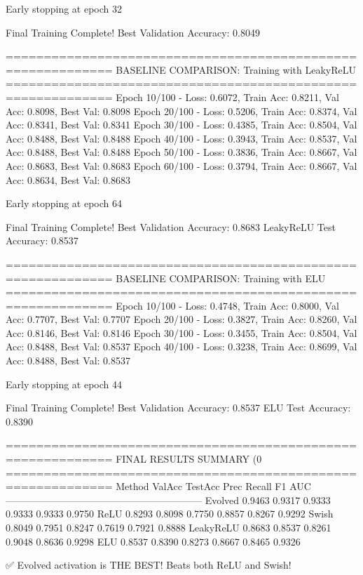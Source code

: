 Early stopping at epoch 32

Final Training Complete!
Best Validation Accuracy: 0.8049

============================================================
BASELINE COMPARISON: Training with LeakyReLU
============================================================
Epoch  10/100 - Loss: 0.6072, Train Acc: 0.8211, Val Acc: 0.8098, Best Val: 0.8098
Epoch  20/100 - Loss: 0.5206, Train Acc: 0.8374, Val Acc: 0.8341, Best Val: 0.8341
Epoch  30/100 - Loss: 0.4385, Train Acc: 0.8504, Val Acc: 0.8488, Best Val: 0.8488
Epoch  40/100 - Loss: 0.3943, Train Acc: 0.8537, Val Acc: 0.8488, Best Val: 0.8488
Epoch  50/100 - Loss: 0.3836, Train Acc: 0.8667, Val Acc: 0.8683, Best Val: 0.8683
Epoch  60/100 - Loss: 0.3794, Train Acc: 0.8667, Val Acc: 0.8634, Best Val: 0.8683

Early stopping at epoch 64

Final Training Complete!
Best Validation Accuracy: 0.8683
LeakyReLU Test Accuracy: 0.8537

============================================================
BASELINE COMPARISON: Training with ELU
============================================================
Epoch  10/100 - Loss: 0.4748, Train Acc: 0.8000, Val Acc: 0.7707, Best Val: 0.7707
Epoch  20/100 - Loss: 0.3827, Train Acc: 0.8260, Val Acc: 0.8146, Best Val: 0.8146
Epoch  30/100 - Loss: 0.3455, Train Acc: 0.8504, Val Acc: 0.8488, Best Val: 0.8537
Epoch  40/100 - Loss: 0.3238, Train Acc: 0.8699, Val Acc: 0.8488, Best Val: 0.8537

Early stopping at epoch 44

Final Training Complete!
Best Validation Accuracy: 0.8537
ELU Test Accuracy: 0.8390

============================================================
FINAL RESULTS SUMMARY (0%
============================================================
Method             ValAcc     TestAcc    Prec       Recall     F1         AUC
------------------------------------------------------------
Evolved            0.9463     0.9317     0.9333     0.9333     0.9333     0.9750
ReLU               0.8293     0.8098     0.7750     0.8857     0.8267     0.9292
Swish              0.8049     0.7951     0.8247     0.7619     0.7921     0.8888
LeakyReLU          0.8683     0.8537     0.8261     0.9048     0.8636     0.9298
ELU                0.8537     0.8390     0.8273     0.8667     0.8465     0.9326

✅ Evolved activation is THE BEST! Beats both ReLU and Swish!


